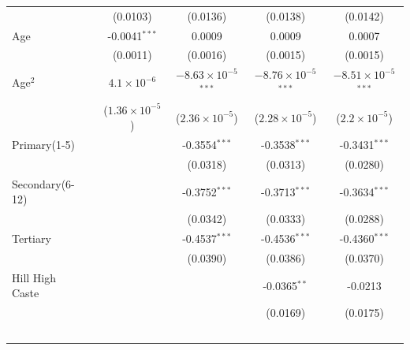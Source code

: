 \begin{tabular}{lccccc}
                                               &                 & (0.0103)                & (0.0136)                       & (0.0138)                       & (0.0142)\\   
   Age                                         &                 & -0.0041$^{***}$         & 0.0009                         & 0.0009                         & 0.0007\\   
                                               &                 & (0.0011)                & (0.0016)                       & (0.0015)                       & (0.0015)\\   
   Age$^2$                                &                 & $4.1\times 10^{-6}$     & $-8.63\times 10^{-5}$$^{***}$  & $-8.76\times 10^{-5}$$^{***}$  & $-8.51\times 10^{-5}$$^{***}$\\    
                                               &                 & ($1.36\times 10^{-5}$)  & ($2.36\times 10^{-5}$)         & ($2.28\times 10^{-5}$)         & ($2.2\times 10^{-5}$)\\    
   Primary(1-5)     &                 &                         & -0.3554$^{***}$                & -0.3538$^{***}$                & -0.3431$^{***}$\\   
                                               &                 &                         & (0.0318)                       & (0.0313)                       & (0.0280)\\   
   Secondary(6-12)  &                 &                         & -0.3752$^{***}$                & -0.3713$^{***}$                & -0.3634$^{***}$\\   
                                               &                 &                         & (0.0342)                       & (0.0333)                       & (0.0288)\\   
   Tertiary         &                 &                         & -0.4537$^{***}$                & -0.4536$^{***}$                & -0.4360$^{***}$\\   
                                               &                 &                         & (0.0390)                       & (0.0386)                       & (0.0370)\\   
   Hill High Caste              &                 &                         &                                & -0.0365$^{**}$                 & -0.0213\\   
                                               &                 &                         &                                & (0.0169)                       & (0.0175)\\   
$$
\end{tabular}
